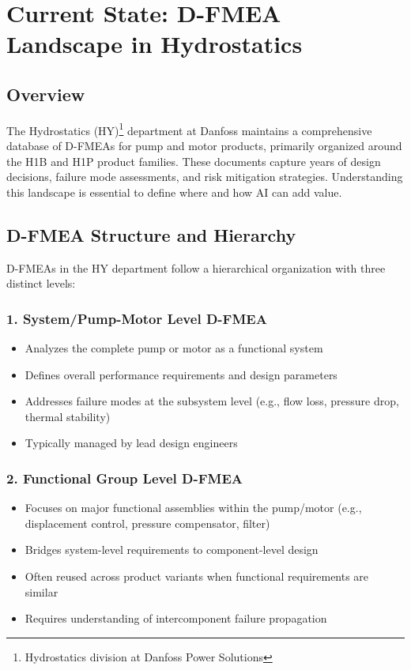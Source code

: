 
\section{Current State: D-FMEA Landscape in Hydrostatics}

\subsection*{Overview}

The Hydrostatics (HY)\footnote{Hydrostatics division at Danfoss Power Solutions} department at Danfoss maintains a comprehensive database of D-FMEAs for pump and motor products, primarily organized around the H1B and H1P product families. These documents capture years of design decisions, failure mode assessments, and risk mitigation strategies. Understanding this landscape is essential to define where and how AI can add value.

\subsection*{D-FMEA Structure and Hierarchy}

D-FMEAs in the HY department follow a hierarchical organization with three distinct levels:

\subsubsection*{1. System/Pump-Motor Level D-FMEA}
\begin{itemize}
    \item Analyzes the complete pump or motor as a functional system
    \item Defines overall performance requirements and design parameters
    \item Addresses failure modes at the subsystem level (e.g., flow loss, pressure drop, thermal stability)
    \item Typically managed by lead design engineers
\end{itemize}

\subsubsection*{2. Functional Group Level D-FMEA}
\begin{itemize}
    \item Focuses on major functional assemblies within the pump/motor (e.g., displacement control, pressure compensator, filter)
    \item Bridges system-level requirements to component-level design
    \item Often reused across product variants when functional requirements are similar
    \item Requires understanding of intercomponent failure propagation
\end{itemize}

